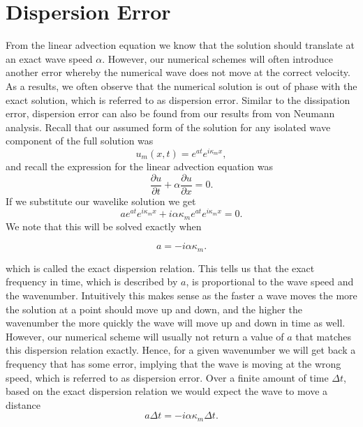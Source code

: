 \section{Dispersion Error}
From the linear advection equation we know that the solution should translate at an exact wave speed $\alpha$. However, our numerical schemes will often introduce another error whereby the numerical wave does not move at the correct velocity. As a results, we often observe that the numerical solution is out of phase with the exact solution, which is referred to as dispersion error. Similar to the dissipation error, dispersion error can also be found from our results from von Neumann analysis. Recall that our assumed form of the solution for any isolated wave component of the full solution was
\begin{equation}
	u_m(x,t) = e^{at} e^{i \kappa_m x},
\end{equation}
and recall the expression for the linear advection equation was
\begin{equation}
	\frac{\partial u}{\partial t} +  \alpha \frac{\partial u}{\partial x} = 0.
\end{equation}
If we substitute our wavelike solution we get
\begin{equation}
	ae^{at} e^{i \kappa_m x} + i \alpha \kappa_m e^{at} e^{i \kappa_m x} = 0.
\end{equation}
We note that this will be solved exactly when
\begin{eqBox}
\begin{equation}
	a = -i \alpha \kappa_m.
\end{equation}
\end{eqBox}
which is called the exact dispersion relation. This tells us that the exact frequency in time, which is described by $a$, is proportional to the wave speed and the wavenumber. Intuitively this makes sense as the faster a wave moves the more the solution at a point should move up and down, and the higher the wavenumber the more quickly the wave will move up and down in time as well. However, our numerical scheme will usually not return a value of $a$ that matches this dispersion relation exactly. Hence, for a given wavenumber we will get back a frequency that has some error, implying that the wave is moving at the wrong speed, which is referred to as dispersion error. Over a finite amount of time $\Delta t$, based on the exact dispersion relation we would expect the wave to move a distance
\begin{equation}
	a \Delta t = -i \alpha \kappa_m \Delta t.
\end{equation}


